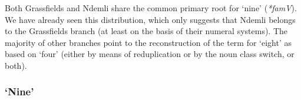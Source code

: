 Both Grassfields and Ndemli share the common primary root for `nine' (\textit{*famV}). We have already seen this distribution, 
which only suggests that Ndemli belongs to the Grassfields branch (at least on the basis of their numeral systems). The majority of other branches point to the reconstruction of the term for `eight' as based on `four' (either by means of reduplication or by the noun class switch, or both).
   
\subsubsection{`Nine'} 
\begin{table}
\caption{\label{tab:3:10}Bantoid stems and patterns for `9'}

\end{table}
